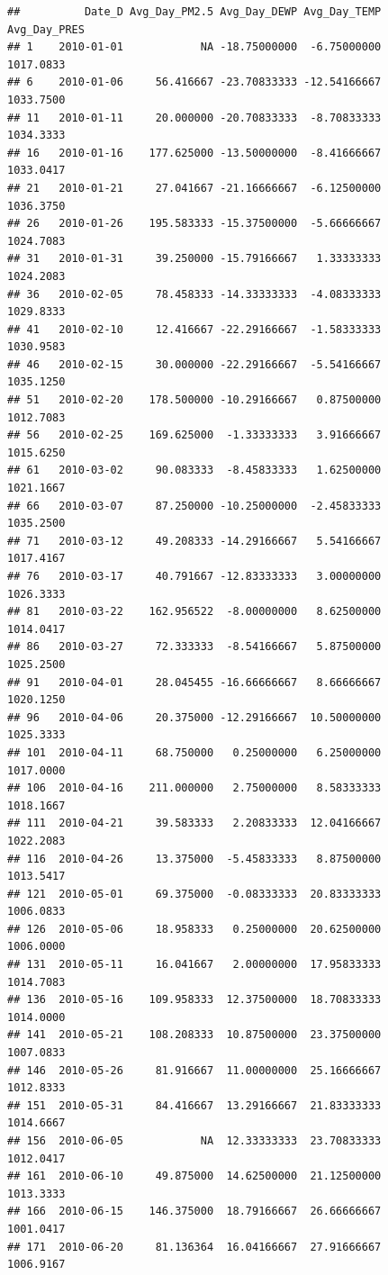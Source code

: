 \documentclass[
]{article}
\begin{document}
\begin{verbatim}
##          Date_D Avg_Day_PM2.5 Avg_Day_DEWP Avg_Day_TEMP Avg_Day_PRES
## 1    2010-01-01            NA -18.75000000  -6.75000000    1017.0833
## 6    2010-01-06     56.416667 -23.70833333 -12.54166667    1033.7500
## 11   2010-01-11     20.000000 -20.70833333  -8.70833333    1034.3333
## 16   2010-01-16    177.625000 -13.50000000  -8.41666667    1033.0417
## 21   2010-01-21     27.041667 -21.16666667  -6.12500000    1036.3750
## 26   2010-01-26    195.583333 -15.37500000  -5.66666667    1024.7083
## 31   2010-01-31     39.250000 -15.79166667   1.33333333    1024.2083
## 36   2010-02-05     78.458333 -14.33333333  -4.08333333    1029.8333
## 41   2010-02-10     12.416667 -22.29166667  -1.58333333    1030.9583
## 46   2010-02-15     30.000000 -22.29166667  -5.54166667    1035.1250
## 51   2010-02-20    178.500000 -10.29166667   0.87500000    1012.7083
## 56   2010-02-25    169.625000  -1.33333333   3.91666667    1015.6250
## 61   2010-03-02     90.083333  -8.45833333   1.62500000    1021.1667
## 66   2010-03-07     87.250000 -10.25000000  -2.45833333    1035.2500
## 71   2010-03-12     49.208333 -14.29166667   5.54166667    1017.4167
## 76   2010-03-17     40.791667 -12.83333333   3.00000000    1026.3333
## 81   2010-03-22    162.956522  -8.00000000   8.62500000    1014.0417
## 86   2010-03-27     72.333333  -8.54166667   5.87500000    1025.2500
## 91   2010-04-01     28.045455 -16.66666667   8.66666667    1020.1250
## 96   2010-04-06     20.375000 -12.29166667  10.50000000    1025.3333
## 101  2010-04-11     68.750000   0.25000000   6.25000000    1017.0000
## 106  2010-04-16    211.000000   2.75000000   8.58333333    1018.1667
## 111  2010-04-21     39.583333   2.20833333  12.04166667    1022.2083
## 116  2010-04-26     13.375000  -5.45833333   8.87500000    1013.5417
## 121  2010-05-01     69.375000  -0.08333333  20.83333333    1006.0833
## 126  2010-05-06     18.958333   0.25000000  20.62500000    1006.0000
## 131  2010-05-11     16.041667   2.00000000  17.95833333    1014.7083
## 136  2010-05-16    109.958333  12.37500000  18.70833333    1014.0000
## 141  2010-05-21    108.208333  10.87500000  23.37500000    1007.0833
## 146  2010-05-26     81.916667  11.00000000  25.16666667    1012.8333
## 151  2010-05-31     84.416667  13.29166667  21.83333333    1014.6667
## 156  2010-06-05            NA  12.33333333  23.70833333    1012.0417
## 161  2010-06-10     49.875000  14.62500000  21.12500000    1013.3333
## 166  2010-06-15    146.375000  18.79166667  26.66666667    1001.0417
## 171  2010-06-20     81.136364  16.04166667  27.91666667    1006.9167

\end{verbatim}
\end{document}
